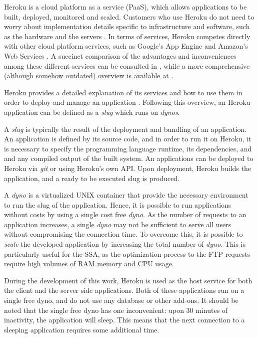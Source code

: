 Heroku is a cloud platform as a service (PaaS), which allows applications to be built, deployed, monitored and scaled. Customers who use Heroku do not need to worry about implementation details specific to infrastructure and software, such as the hardware and the servers \cite{heroku_what}. In terms of services, Heroku competes directly with other cloud platform services, such as Google's App Engine \cite{google_app} and Amazon's Web Services \cite{amazon_web}. A succinct comparison of the advantages and inconveniences among these different services can be consulted in \cite{cloud_comparison}, while a more comprehensive (although somehow outdated) overview is available at \cite{cloud_article}.

Heroku provides a detailed explanation of its services and how to use them in order to deploy and manage an application \cite{heroku_how}. Following this overview, an Heroku application can be defined as a \textit{slug} which runs on \textit{dynos}. 

A \textit{slug} is typically the result of the deployment and bundling of an application. An application is defined by its source code, and in order to run it on Heroku, it is necessary to specify the programming language runtime, its dependencies, and and any compiled output of the built system. An applications can be deployed to Heroku via \textit{git} or using Heroku's own API. Upon deployment, Heroku builds the application, and a ready to be executed slug is produced.

A \textit{dyno} is a virtualized UNIX container that provide the necessary environment to run the slug of the application. Hence, it is possible to run applications without costs by using a single cost free \textit{dyno}. As the number of requests to an application increases, a single \textit{dyno} may not be sufficient to serve all users without compromising the connection time. To overcome this, it is possible to \textit{scale} the developed application by increasing the total number of \textit{dyno}. This is particularly useful for the SSA, as the optimization process to the FTP requests require high volumes of RAM memory and CPU usage. 

During the development of this work, Heroku is used as the host service for both the client and the server side applications. Both of these applications run on a single free dyno, and do not use any database or other add-ons. It should be noted that the single free dyno has one inconvenient: upon 30 minutes of inactivity, the application will sleep. This means that the next connection to a sleeping application requires some additional time.  


